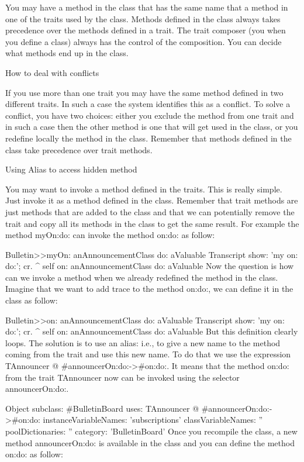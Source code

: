 You may have a method in the class that has the same name that a method in one of the traits used by the class. Methods defined in the class always takes precedence over the methods defined in a trait. The trait composer (you when you define a class) always has the control of the composition. You can decide what methods end up in the class.

How to deal with conflicts

If you use more than one trait you may have the same method defined in two different traits. In such a case the system identifies this as a conflict. To solve a conflict, you have two choices: either you exclude the method from one trait and in such a case then the other method is one that will get used in the class, or you redefine locally the method in the class. Remember that methods defined in the class take precedence over trait methods.

Using Alias to access hidden method

You may want to invoke a method defined in the traits. This is really simple. Just invoke it as a method defined in the class. Remember that trait methods are just methods that are added to the class and that we can potentially remove the trait and copy all its methods in the class to get the same result. For example the method myOn:do: can invoke the method on:do: as follow:

Bulletin>>myOn: anAnnouncementClass do: aValuable
	Transcript show: 'my on: do:'; cr.
	^ self on: anAnnouncementClass do: aValuable
Now the question is how can we invoke a method when we already redefined the method in the class. Imagine that we want to add trace to the method on:do:, we can define it in the class as follow:

Bulletin>>on: anAnnouncementClass do: aValuable
	Transcript show: 'my on: do:'; cr.
	^ self on: anAnnouncementClass do: aValuable
But this definition clearly loops. The solution is to use an alias: i.e., to give a new name to the method coming from the trait and use this new name. To do that we use the expression TAnnouncer @ {#announcerOn:do:->#on:do:}. It means that the method on:do: from the trait TAnnouncer now can be invoked using the selector announcerOn:do:.

Object subclass: #BulletinBoard
	uses: TAnnouncer @ {#announcerOn:do:->#on:do:}
	instanceVariableNames: 'subscriptions'
	classVariableNames: ''
	poolDictionaries: ''
	category: 'BulletinBoard'
Once you recompile the class, a new method announcerOn:do: is available in the class and you can define the method on:do: as follow:

